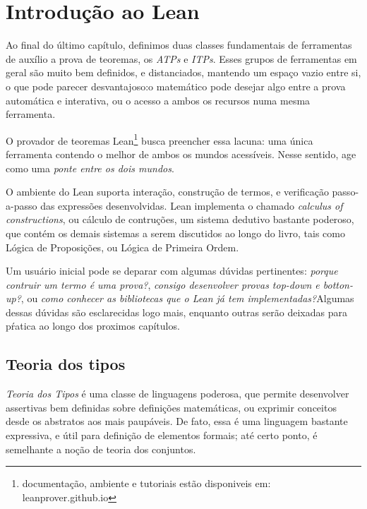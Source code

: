 \chapter{Introdução ao Lean }

Ao final do último capítulo, definimos duas classes fundamentais de ferramentas de auxílio a prova de teoremas, os \textit{ATPs} e \textit{ITPs}.
Esses grupos de ferramentas em geral são muito bem definidos, e distanciados, mantendo um espaço vazio entre si, o que pode parecer desvantajoso:o  matemático pode desejar algo entre a prova automática e interativa, ou o acesso a ambos os recursos numa mesma ferramenta.

O provador de teoremas Lean\footnote{documentação, ambiente e tutoriais estão disponiveis em: leanprover.github.io} busca preencher essa lacuna: uma única ferramenta contendo o melhor de ambos os mundos acessíveis.
Nesse sentido, age como uma \textit{ponte entre os dois mundos}.

O ambiente do Lean suporta interação, construção de termos, e verificação passo-a-passo das expressões desenvolvidas.
Lean implementa o chamado \textit{calculus of constructions}, ou cálculo de contruções, um sistema dedutivo bastante poderoso, que contém os demais sistemas a serem discutidos ao longo do livro, tais como Lógica de Proposições, ou Lógica de Primeira Ordem.

Um usuário inicial pode se deparar com algumas dúvidas pertinentes: \textit{porque contruir um termo é uma prova?}, \textit{consigo desenvolver provas top-down e botton-up?}, ou \textit{como conhecer as bibliotecas que o Lean já tem implementadas?}Algumas dessas dúvidas são esclarecidas logo mais, enquanto outras serão deixadas para pŕatica ao longo dos proximos capítulos.

\section{Teoria dos tipos}
\textit{Teoria dos Tipos} é uma classe de linguagens poderosa, que permite desenvolver assertivas bem definidas sobre definições matemáticas, ou exprimir conceitos desde os abstratos aos mais paupáveis.
De fato, essa é uma linguagem bastante expressiva, e útil para definição de elementos formais; até certo ponto, é semelhante a noção de teoria dos conjuntos.

